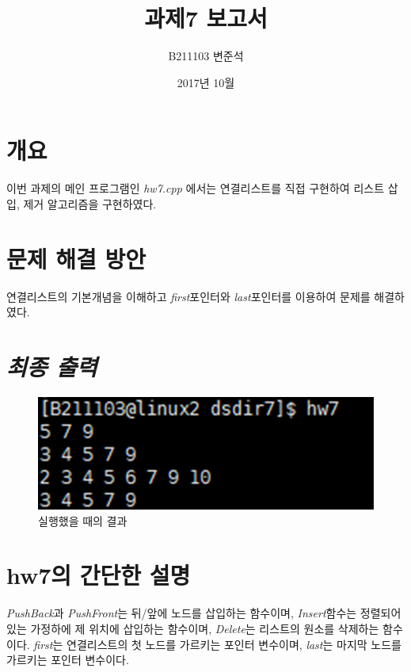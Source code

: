 \documentclass[a4paper,12pt]{article}
\begin{document}
 
    
    \title{과제7 보고서}
    \author{B211103 변준석}
    \date{2017년 10월}
    \maketitle

    \newpage
    \section{개요}
    이번 과제의 메인 프로그램인 \textsl{hw7.cpp} 에서는 연결리스트를 직접 구현하여 리스트 삽입, 제거 알고리즘을 구현하였다.
    
    \section{문제 해결 방안}
    연결리스트의 기본개념을 이해하고 \textsl{first}포인터와 \textsl{last}포인터를 이용하여 문제를 해결하였다.

    \section{\textsl{최종 출력}}
    \begin{figure}[t]\vspace*{4pt} 
    \centerline{\includegraphics[width=1.0\columnwidth]{result}} 
    \caption{실행했을 때의 결과}\vspace*{-6pt} 
    \label{figure:result} 
    \end{figure} 
    
    
    \section{hw7의 간단한 설명}
    \textsl{PushBack}과 \textsl{PushFront}는 뒤/앞에 노드를 삽입하는 함수이며, \textsl{Insert}함수는 정렬되어있는 가정하에 제 위치에 삽입하는 함수이며, \textsl{Delete}는 리스트의 원소를 삭제하는 함수이다.
    \textsl{first}는 연결리스트의 첫 노드를 가르키는 포인터 변수이며, \textsl{last}는 마지막 노드를 가르키는 포인터 변수이다.
\end{document}
